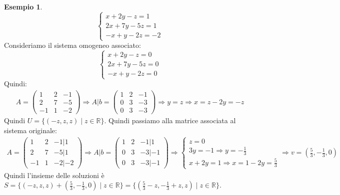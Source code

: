\documentclass[a4paper]{article}
\theoremstyle{definition}
\newtheorem*{es}{Esempio}
\begin{document}
	\begin{es}
		\[ \begin{cases}
			x + 2y - z = 1 \\
			2x + 7y - 5z = 1 \\
			 -x + y - 2z = -2
		\end{cases} \]
		Consideriamo il sistema omogeneo associato:
		\[ \begin{cases}
			x + 2y - z = 0 \\
			2x + 7y - 5z = 0 \\
			 -x + y - 2z = 0
		\end{cases} \]
		Quindi:
		\begin{align*}
			A = \begin{pmatrix}
				1 & 2 & -1 \\
				2 & 7 & -5 \\
				-1 & 1 & -2
			\end{pmatrix} \Rightarrow A|b = \begin{pmatrix}
				1 & 2 & -1 \\
				0 & 3 & -3 \\
				0 & 3 & - 3
			\end{pmatrix} \Rightarrow y = z \Rightarrow x = z - 2y = - z
		\end{align*}
		Quindi $U = \{(-z, z, z) \mid z \in \mathbb{R}\}$. Quindi passiamo alla matrice associata al sistema originale:
		\begin{align*}
			A = \begin{pmatrix}
				1 & 2 & -1 | 1 \\
				2 & 7 & -5 | 1 \\
				-1 & 1 & -2 | - 2
			\end{pmatrix} \Rightarrow A|b = \begin{pmatrix}
				1 & 2 & -1 | 1 \\
				0 & 3 & -3 | - 1 \\
				0 & 3 & -3 | - 1
			\end{pmatrix} \Rightarrow \begin{cases}
				z = 0 \\
				3y = -1 \Rightarrow y = -\frac{1}{3} \\
				x + 2y = 1 \Rightarrow x = 1 - 2y = \frac{5}{3}
			\end{cases} \Rightarrow v = (\frac{5}{3}, -\frac{1}{3}, 0)
		\end{align*}
		Quindi l'insieme delle soluzioni è $S = \{(-z, z, z) + (\frac{5}{3}, -\frac{1}{3}, 0) \mid z \in \mathbb{R}\} = \{(\frac{5}{3} - z, -\frac{1}{3} + z, z) \mid z \in \mathbb{R}\}$.
	\end{es}
\end{document}
